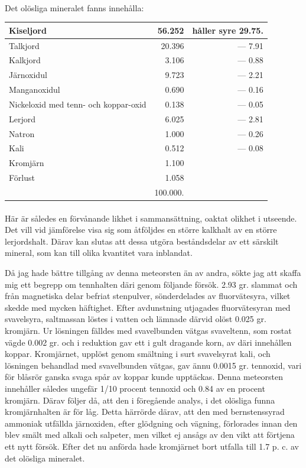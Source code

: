 \documentclass[a4paper, 12pt, oneside, swedish]{article}
\begin{document}
\paragraph{}
Det olösliga mineralet fanns innehålla:
\begin{table}[H]
    \centering\small
    \begin{tabular}{|l|r|r|}
    \hline
        Kiseljord & 56.252 & håller syre 29.75. \\ \hline
        Talkjord & 20.396 & --- 7.91 \\ \hline
        Kalkjord & 3.106 & --- 0.88 \\ \hline
        Järnoxidul & 9.723 & --- 2.21 \\ \hline
        Manganoxidul & 0.690 & --- 0.16 \\ \hline
        Nickeloxid med tenn- och koppar-oxid & 0.138 & --- 0.05 \\ \hline
        Lerjord & 6.025 & --- 2.81 \\ \hline
        Natron & 1.000 & --- 0.26 \\ \hline
        Kali & 0.512 & --- 0.08 \\ \hline
        Kromjärn & 1.100 & ~ \\ \hline
        Förlust & 1.058 & ~ \\ \hline
        ~ & 100.000. & ~ \\ \hline
    \end{tabular}
\end{table}
\paragraph{}
Här är således en förvånande likhet i sammansättning, oaktat olikhet i utseende. Det vill vid jämförelse visa sig som åtföljdes en större kalkhalt av en större lerjordshalt. Därav kan slutas att dessa utgöra beståndsdelar av ett särskilt mineral, som kan till olika kvantitet vara inblandat.

Då jag hade bättre tillgång av denna meteorsten än av andra, sökte jag att skaffa mig ett begrepp om tennhalten däri genom följande försök. 2.93 gr. slammat och från magnetiska delar befriat stenpulver, sönderdelades av fluorvätesyra, vilket skedde med mycken häftighet. Efter avdunstning utjagades fluorvätesyran med svavelsyra, saltmassan löstes i vatten och lämnade därvid olöst 0.025 gr. kromjärn. Ur lösningen fälldes med svavelbunden vätgas svaveltenn, som rostat vägde 0.002 gr. och i reduktion gav ett i gult dragande korn, av däri innehållen koppar. Kromjärnet, upplöst genom smältning i surt svavelsyrat kali, och lösningen behandlad med svavelbunden vätgas, gav ännu 0.0015 gr. tennoxid, vari för blåsrör ganska svaga spår av koppar kunde upptäckas. Denna meteorsten innehåller således ungefär 1/10 procent tennoxid och 0.84 av en procent kromjärn. Därav följer då, att den i föregående analys, i det olösliga funna kromjärnhalten är för låg. Detta härrörde därav, att den med bernstenssyrad ammoniak utfällda järnoxiden, efter glödgning och vägning, förlorades innan den blev smält med alkali och salpeter, men vilket ej ansågs av den vikt att förtjena ett nytt försök. Efter det nu anförda hade kromjärnet bort utfalla till 1.7 p. c. av det olösliga mineralet.
\clearpage
\end{document}
